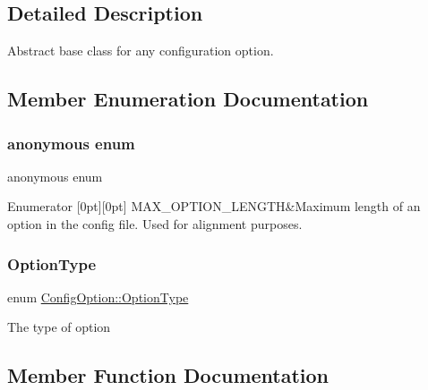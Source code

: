 \subsection{Detailed Description}
Abstract base class for any configuration option. 

\subsection{Member Enumeration Documentation}
\mbox{\label{class_config_option_a7e6106faa6a60aebbb84ff484e4ec85f}} 
\subsubsection{\texorpdfstring{anonymous enum}{anonymous enum}}
{\footnotesize\ttfamily anonymous enum}

\begin{DoxyEnumFields}{Enumerator}
[0pt][0pt]{}\mbox{\label{class_config_option_a7e6106faa6a60aebbb84ff484e4ec85faa40e4123355dbeb41dc6ca0c68c0d346}} 
M\+A\+X\+\_\+\+O\+P\+T\+I\+O\+N\+\_\+\+L\+E\+N\+G\+TH&Maximum length of an option in the config file. Used for alignment purposes. \\
\hline

\end{DoxyEnumFields}
\mbox{\label{class_config_option_ad60cb308cdf307e72796dc2fc2a40fda}} 
\subsubsection{\texorpdfstring{OptionType}{OptionType}}
{\footnotesize\ttfamily enum \mbox{\hyperlink{class_config_option_ad60cb308cdf307e72796dc2fc2a40fda}{Config\+Option\+::\+Option\+Type}}}

The type of option 

\subsection{Member Function Documentation}
\mbox{\label{class_config_option_af9d4d56d36500792b82fce5b11202a60}} 
